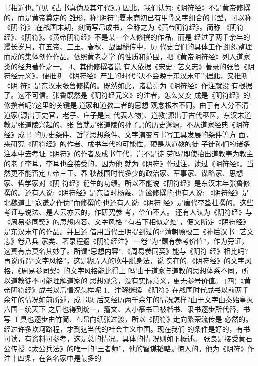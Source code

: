 \documentclass[12pt,UTF8]{ctexbook}
\begin{document}
书相近也。”(见《古书真伪及其年代》。)
因此，我们认为:《阴符经》不是黄帝修撰的，而是黄帝奠定的
雏形，称“阴符”;夏末商初已有甲骨文字组合的书型，可以称《阴
符》;在战国末期，刻简写帛成书，全称之为《黄帝阴符经》。简称
《阴符经》、《阴符》。《黄帝阴符经》不是某一个人修撰的作品，而是
经过了两千余年的漫长岁月，在五帝、三王、春秋、战国秘传中，历
代史官们的具体工作,组织整理而成的集体创作作品。依照黄老之学
的性质和范围，把《黄帝阴符经》列入道家类的经典著作之一。
4、其他修撰者说
有人依据《宋史·艺文志》著录的张鲁《阴符经元义》，便推断
《阴符经》产生的时代“决不会晚于东汉末年”;据此，又推断《阴
符》是东汉末张鲁修撰的。既然如此，诸葛亮为《阴符经》作注就没
有根据了。这不可信。张鲁既然是《阴符经元义》的注者，怎么又变
成是《阴符经》的修撰者呢?这里的关键是:道家和道教二者的思想
观念根本不同。由于有人分不清道家(源出于史官，老子、庄子是其
代表人物)、道教(源出于古代巫医，东汉末道教是张道陵兴起的、张
鲁就是张道陵的孙子。)的历史渊源，不从道家经典《阴符经》成书
的历史条件、哲学思想条件、文字演变与书写工具发展的条件等方
面，来研究《阴符经》的作者、成书年代的可能性，硬是从道教的徒
子徒孙们的诸多注本中去考证《阴符》的作者及成书年代，岂不是徒
劳吗?即使抬出道教奉为教主的老子李耳，李耳也会接受的，因为他
就为《阴符》作过注，读过《阴符经》。当然更不能否定五帝三王、春
秋战国时代多少的政治家、军事家、谋略家、思想家、哲学家对《阴
符经》诞生的功绩。所以不能说《阴符经》是东汉末年张鲁修撰的。还有人说:《阴符经》是东晋时杨羲、许谧修撰的;也有人说:
《阴符经》是北魏道士“寇谦之作伪”而修撰的;也还有人说:《阴符
经》是唐代李筌杜撰的。这些考证与说法、是人云亦云的，作研究参
考，价值不大。
还有人认为《阴符经》与《周易参同契》的思想内容、文字风格
“有若下相似之处”，便又断定《阴符经》是东汉末年的作品。并且还
借用当代王明提到过的:“清朝顾榱三《补后汉书·艺文志》卷八兵
家类、著录程遐《阴符经注》-一卷”为“颇有参考价值”，作为旁证，
这真有点莫名其妙了。所谓“思想内容”,《周易参同契》能与《阴符
经》相比吗?再说所谓“文字风格”，这是糊弄人的吹牛脱身法，说
实在的.《阴符经》的文字风格，《周易参同契》的文字风格能比得上
吗!由于道家与道教的思想体系不同，所以道教徒不可能理解道家的
思想观念，没有实际意义，更无参号价值。
(四)《黄帝阴符经》成书以后情况怎样呢
1、注解继续
《阴符》在战国时代成书以前两千余年的情况如前所述，成书以
后又经历两千余年的情况怎样?由于文字由秦始皇灭六国一统天下
之后也得到统一，籀文、大小篆书已被楷书、隶书逐步所代替，书写
工具也逐步由竹简、布帛向纸张过渡，所以《阴符》走向繁荣流传是
必然的。经过许多坎坷路程，才到达当代的社会主义中国。现在我们
的条件是好的，有书可读，有资料可参考，这是总的情况。具体的情
况则如下概述。
张良是接受黄石公传授《太公兵法》的唯一的“王者师”，他的智谋韬略是惊人的。他为《阴符》作注十四条，在各名家中是最多的
\end{document}
